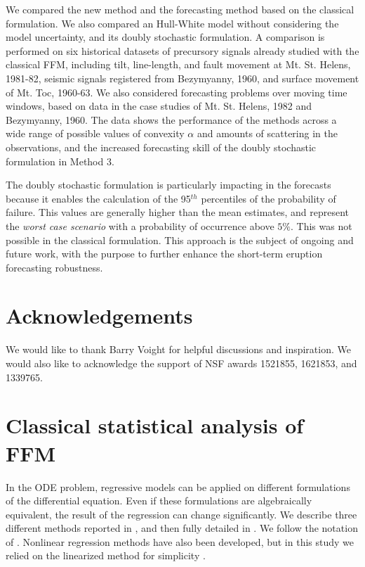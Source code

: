 \documentclass{article}
\begin{document}
We compared the new method and the forecasting method based on the classical formulation. We also compared an Hull-White model without considering the model uncertainty, and its doubly stochastic formulation. A comparison is performed on six historical datasets of precursory signals already studied with the classical FFM, including tilt, line-length, and fault movement at Mt. St. Helens, 1981-82, seismic signals registered from Bezymyanny, 1960, and surface movement of Mt. Toc, 1960-63. We also considered forecasting problems over moving time windows, based on data in the case studies of Mt. St. Helens, 1982 and Bezymyanny, 1960. The data shows the performance of the methods across a wide range of possible values of convexity $\alpha$ and amounts of scattering in the observations, and the increased forecasting skill of the doubly stochastic formulation in Method 3.

The doubly stochastic formulation is particularly impacting in the forecasts because it enables the calculation of the 95$^{th}$ percentiles of the probability of failure. This values are generally higher than the mean estimates, and represent the \emph{worst case scenario} with a probability of occurrence above $5\%$. This was not possible in the classical formulation. This approach is the subject of ongoing and future work, with the purpose to further enhance the short-term eruption forecasting robustness.

\section*{Acknowledgements}

We would like to thank Barry Voight for helpful discussions and inspiration. We would also like to acknowledge the support of NSF awards 1521855, 1621853, and 1339765.


\appendix
\section{Classical statistical analysis of FFM}\label{A-1}
In the ODE problem, regressive models can be applied on different formulations of the differential equation. Even if these formulations are algebraically equivalent, the result of the regression can change significantly. We describe three different methods reported in \cite{Voight1988}, and then fully detailed in \cite{Cornelius1995}. We follow the notation of \cite{Cornelius1995}. Nonlinear regression methods have also been developed, but in this study we relied on the linearized method for simplicity \citep{Bell2011}.
\end{document}
